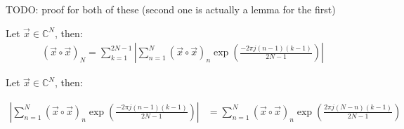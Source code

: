 TODO: proof for both of these (second one is actually a lemma for the first)

\begin{blockTheorem} \label{th:abs_psd}
Let $\vec{x} \in \mathbb{C}^N$, then:
\begin{align*}
(\vec{x} \circ \vec{x})_N = \sum_{k=1}^{2N-1} \left| \sum_{n=1}^N (\vec{x} \circ \vec{x})_n \exp \left(\frac{-2\pi j (n-1)(k-1)}{2N-1}\right) \right | 
\end{align*}
 \end{blockTheorem}

\begin{blockTheorem} \label{th:abs_psd2}
Let $\vec{x} \in \mathbb{C}^N$, then:

\begin{align*}
\left| \sum_{n=1}^N (\vec{x} \circ \vec{x})_n \exp \left(\frac{-2\pi j (n-1)(k-1)}{2N-1}\right) \right | &= \sum_{n=1}^N (\vec{x} \circ \vec{x})_n \exp \left(\frac{2\pi j (N-n)(k-1)}{2N-1}\right) 
\end{align*}
 \end{blockTheorem}

